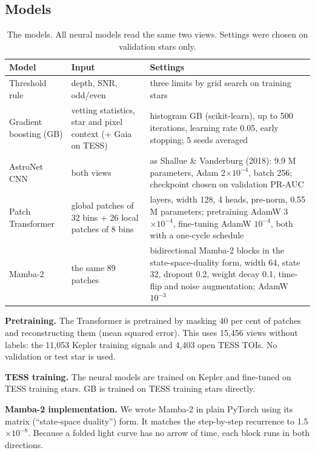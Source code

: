 \documentclass[fleqn,usenatbib]{mnras}
\begin{document}
\subsection{Models}

\begin{table}
\centering
\caption{The models. All neural models read the same two views. Settings were chosen on validation stars only.}
\label{tab:2}
\begin{tabular}{>{\raggedright\arraybackslash}p{1.4cm}>{\raggedright\arraybackslash}p{3.9cm}>{\raggedright\arraybackslash}p{10.5cm}}
\hline
Model & Input & Settings \\
\hline
Threshold rule & depth, SNR, odd/even & three limits by grid search on training stars \\
Gradient boosting (GB) & vetting statistics, star and pixel context (+ Gaia on TESS) & histogram GB (scikit-learn), up to 500 iterations, learning rate 0.05, early stopping; 5 seeds averaged \\
AstroNet CNN & both views & as Shallue \& Vanderburg (2018): 9.9 M parameters, Adam 2$\times10^{-4}$, batch 256; checkpoint chosen on validation PR-AUC \\
Patch Transformer & 63 global patches of 32 bins + 26 local patches of 8 bins & 4 layers, width 128, 4 heads, pre-norm, 0.55 M parameters; pretraining AdamW 3$\times10^{-4}$, fine-tuning AdamW $10^{-4}$, both with a one-cycle schedule \\
Mamba-2 & the same 89 patches & 4 bidirectional Mamba-2 blocks in the state-space-duality form, width 64, state 32, dropout 0.2, weight decay 0.1, time-flip and noise augmentation; AdamW $10^{-3}$ \\
\hline
\end{tabular}
\end{table}

\textbf{Pretraining.} The Transformer is pretrained by masking 40 per cent of patches and reconstructing them (mean squared error). This uses 15,456 views without labels: the 11,053 Kepler training signals and 4,403 open TESS TOIs. No validation or test star is used.

\textbf{TESS training.} The neural models are trained on Kepler and fine-tuned on TESS training stars. GB is trained on TESS training stars directly.

\textbf{Mamba-2 implementation.} We wrote Mamba-2 in plain PyTorch using its matrix (``state-space duality'') form. It matches the step-by-step recurrence to 1.5$\times10^{-8}$. Because a folded light curve has no arrow of time, each block runs in both directions.
\end{document}
